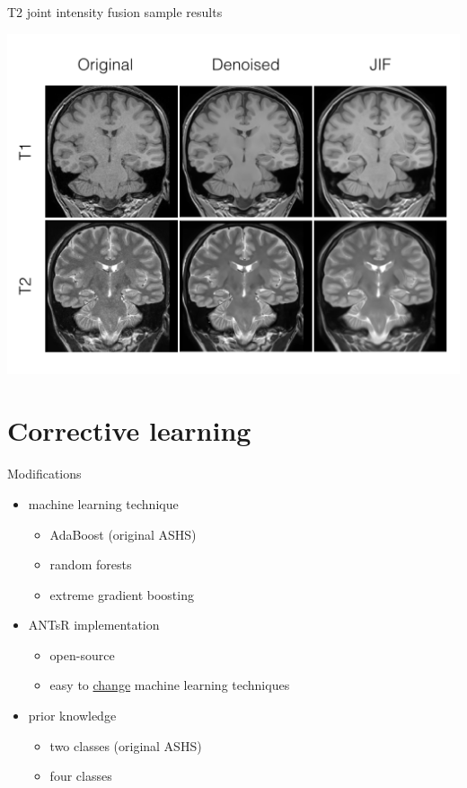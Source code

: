 \documentclass[ignorenonframetext,]{beamer}
\providecommand{\tightlist}{%
  \setlength{\itemsep}{0pt}\setlength{\parskip}{0pt}}
\begin{document}
\begin{frame}{T2 joint intensity fusion sample results}

\centering
\includegraphics[width=0.85 \textwidth]{../Figures/jifResults.png}

\end{frame}

\section{Corrective learning}\label{corrective-learning}

\begin{frame}{Modifications}

\begin{itemize}
\tightlist
\item
  machine learning technique

  \begin{itemize}
  \tightlist
  \item
    AdaBoost (original ASHS)
  \item
    random forests
  \item
    extreme gradient boosting
  \end{itemize}
\item
  ANTsR implementation

  \begin{itemize}
  \tightlist
  \item
    open-source
  \item
    easy to
    \href{https://github.com/stnava/ANTsR/blob/master/R/segmentationRefinement.R\#L375-L413}{change}
    machine learning techniques
  \end{itemize}
\item
  prior knowledge

  \begin{itemize}
  \tightlist
  \item
    two classes (original ASHS)
  \item
    four classes
  \end{itemize}
\end{itemize}

\end{frame}
\end{document}
